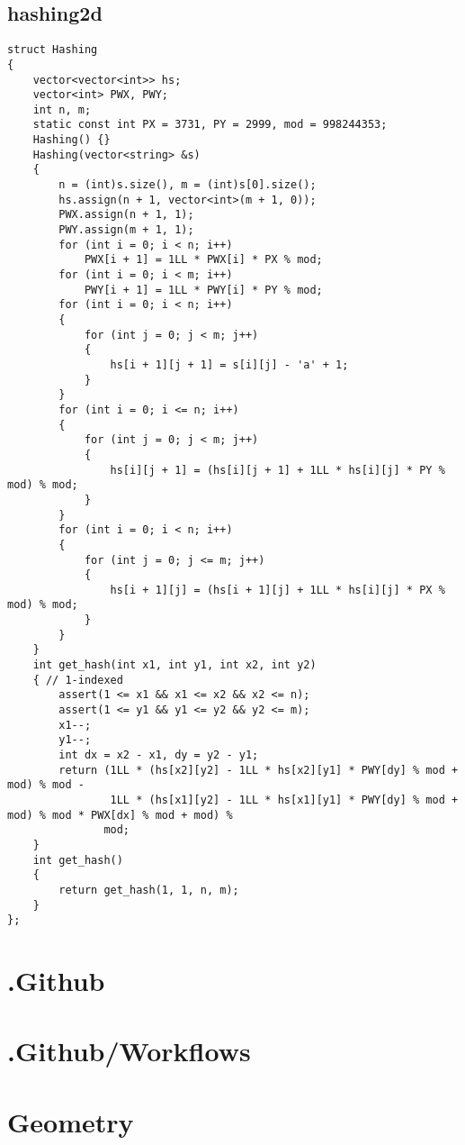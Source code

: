 \subsection*{hashing2d}
\begin{lstlisting}
struct Hashing
{
    vector<vector<int>> hs;
    vector<int> PWX, PWY;
    int n, m;
    static const int PX = 3731, PY = 2999, mod = 998244353;
    Hashing() {}
    Hashing(vector<string> &s)
    {
        n = (int)s.size(), m = (int)s[0].size();
        hs.assign(n + 1, vector<int>(m + 1, 0));
        PWX.assign(n + 1, 1);
        PWY.assign(m + 1, 1);
        for (int i = 0; i < n; i++)
            PWX[i + 1] = 1LL * PWX[i] * PX % mod;
        for (int i = 0; i < m; i++)
            PWY[i + 1] = 1LL * PWY[i] * PY % mod;
        for (int i = 0; i < n; i++)
        {
            for (int j = 0; j < m; j++)
            {
                hs[i + 1][j + 1] = s[i][j] - 'a' + 1;
            }
        }
        for (int i = 0; i <= n; i++)
        {
            for (int j = 0; j < m; j++)
            {
                hs[i][j + 1] = (hs[i][j + 1] + 1LL * hs[i][j] * PY % mod) % mod;
            }
        }
        for (int i = 0; i < n; i++)
        {
            for (int j = 0; j <= m; j++)
            {
                hs[i + 1][j] = (hs[i + 1][j] + 1LL * hs[i][j] * PX % mod) % mod;
            }
        }
    }
    int get_hash(int x1, int y1, int x2, int y2)
    { // 1-indexed
        assert(1 <= x1 && x1 <= x2 && x2 <= n);
        assert(1 <= y1 && y1 <= y2 && y2 <= m);
        x1--;
        y1--;
        int dx = x2 - x1, dy = y2 - y1;
        return (1LL * (hs[x2][y2] - 1LL * hs[x2][y1] * PWY[dy] % mod + mod) % mod -
                1LL * (hs[x1][y2] - 1LL * hs[x1][y1] * PWY[dy] % mod + mod) % mod * PWX[dx] % mod + mod) %
               mod;
    }
    int get_hash()
    {
        return get_hash(1, 1, n, m);
    }
};
\end{lstlisting}

\section*{.Github}

\section*{.Github/Workflows}

\section*{Geometry}

